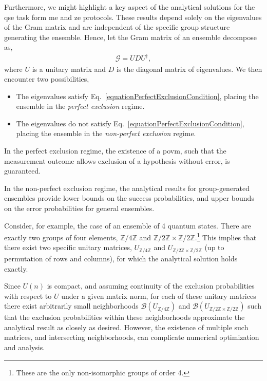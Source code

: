 \documentclass[12pt,letterpaper]{article}
\begin{document}
Furthermore, we might highlight a key aspect of the analytical solutions for the \gls{qse} task form \gls{me} and \gls{ze} protocols. These results depend solely on the eigenvalues of the Gram matrix and are independent of the specific group structure generating the ensemble. Hence, let the Gram matrix of an ensemble decompose as,
\begin{align*}
	\mathcal{G} = U D U^\dagger,
\end{align*}
where $U$ is a unitary matrix and $D$ is the diagonal matrix of eigenvalues. We then encounter two possibilities,
\begin{itemize}
	\item The eigenvalues satisfy Eq.~\eqref{equationPerfectExclusionCondition}, placing the ensemble in the \emph{perfect exclusion} regime.
	\item The eigenvalues do not satisfy Eq.~\eqref{equationPerfectExclusionCondition}, placing the ensemble in the \emph{non-perfect exclusion} regime.
\end{itemize}

In the perfect exclusion regime, the existence of a \gls{povm}, such that the measurement outcome allows exclusion of a hypothesis without error, is guaranteed.

In the non-perfect exclusion regime, the analytical results for group-generated ensembles provide lower bounds on the success probabilities, and upper bounds on the error probabilities for general ensembles.

Consider, for example, the case of an ensemble of 4 quantum states. There are exactly two groups of four elements, $\mathbb{Z}/4\mathbb{Z}$ and $\mathbb{Z}/2\mathbb{Z} \times \mathbb{Z}/2\mathbb{Z}$.\footnote{These are the only non-isomorphic groups of order 4.} This implies that there exist two specific unitary matrices, $U_{\mathbb{Z}/4\mathbb{Z}}$ and $U_{\mathbb{Z}/2\mathbb{Z} \times \mathbb{Z}/2\mathbb{Z}}$ (up to permutation of rows and columns), for which the analytical solution holds exactly.

Since $U(n)$ is compact, and assuming continuity of the exclusion probabilities with respect to $U$ under a given matrix norm, for each of these unitary matrices there exist arbitrarily small neighborhoods $\mathcal{B}(U_{\mathbb{Z}/4\mathbb{Z}})$ and $\mathcal{B}(U_{\mathbb{Z}/2\mathbb{Z} \times \mathbb{Z}/2\mathbb{Z}})$ such that the exclusion probabilities within these neighborhoods approximate the analytical result as closely as desired. However, the existence of multiple such matrices, and intersecting neighborhoods, can complicate numerical optimization and analysis.
\end{document}
